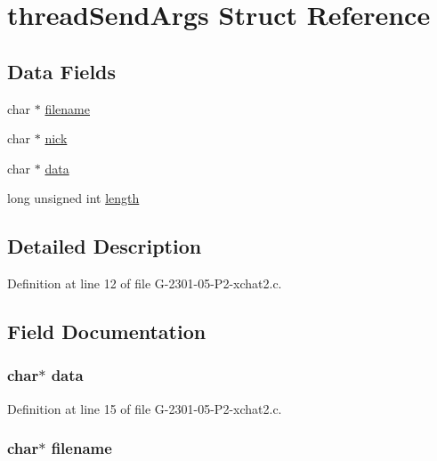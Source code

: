 \hypertarget{structthread_send_args}{\section{thread\-Send\-Args Struct Reference}
\label{structthread_send_args}
}
\subsection*{Data Fields}
\begin{DoxyCompactItemize}
\item 
char $\ast$ \hyperlink{structthread_send_args_aeac90097f29f7529968697163cea5c18}{filename}
\item 
char $\ast$ \hyperlink{structthread_send_args_a89f27568c92a418413e6b37b41f07e21}{nick}
\item 
char $\ast$ \hyperlink{structthread_send_args_a91a70b77df95bd8b0830b49a094c2acb}{data}
\item 
long unsigned int \hyperlink{structthread_send_args_a90bf0058c728d7cea7de336a1251f387}{length}
\end{DoxyCompactItemize}


\subsection{Detailed Description}


Definition at line 12 of file G-\/2301-\/05-\/\-P2-\/xchat2.\-c.



\subsection{Field Documentation}
\hypertarget{structthread_send_args_a91a70b77df95bd8b0830b49a094c2acb}{
\subsubsection[{data}]{\setlength{\rightskip}{0pt plus 5cm}char$\ast$ data}}\label{structthread_send_args_a91a70b77df95bd8b0830b49a094c2acb}


Definition at line 15 of file G-\/2301-\/05-\/\-P2-\/xchat2.\-c.

\hypertarget{structthread_send_args_aeac90097f29f7529968697163cea5c18}{
\subsubsection[{filename}]{\setlength{\rightskip}{0pt plus 5cm}char$\ast$ filename}}\label{structthread_send_args_aeac90097f29f7529968697163cea5c18}


